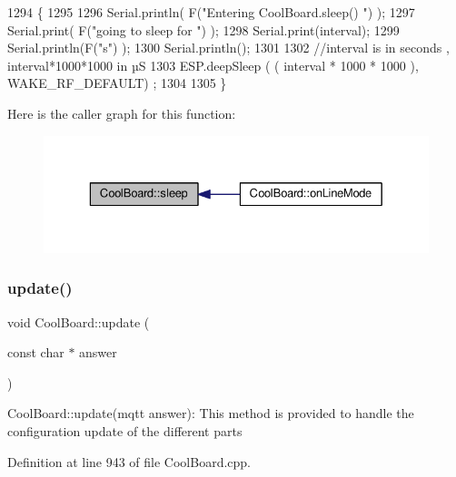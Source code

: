 \begin{DoxyCode}
1294 \{
1295 
1296     Serial.println( F(\textcolor{stringliteral}{"Entering CoolBoard.sleep() "}) );
1297     Serial.print( F(\textcolor{stringliteral}{"going to sleep for "}) );
1298     Serial.print(interval);
1299     Serial.println(F(\textcolor{stringliteral}{"s"}) );
1300     Serial.println();
1301     
1302     \textcolor{comment}{//interval is in seconds , interval*1000*1000 in µS}
1303     ESP.deepSleep ( ( interval * 1000 * 1000 ), WAKE\_RF\_DEFAULT) ;
1304 
1305 \}
\end{DoxyCode}
Here is the caller graph for this function\+:
\nopagebreak
\begin{figure}[H]
\begin{center}
\leavevmode
\includegraphics[width=329pt]{d7/df9/class_cool_board_a069952cdcb2e7f68518aa429eceadb6e_icgraph}
\end{center}
\end{figure}
\mbox{\label{class_cool_board_a8612756d3f73198cdde857a66f0fe690}} 
\subsubsection{\texorpdfstring{update()}{update()}}
{\footnotesize\ttfamily void Cool\+Board\+::update (\begin{DoxyParamCaption}\item[{const char $\ast$}]{answer }\end{DoxyParamCaption})}

Cool\+Board\+::update(mqtt answer)\+: This method is provided to handle the configuration update of the different parts 

Definition at line 943 of file Cool\+Board.\+cpp.


